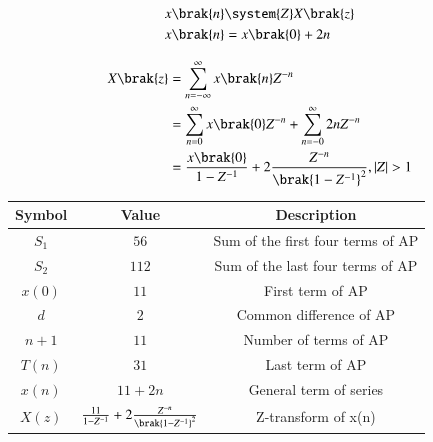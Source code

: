 \documentclass[journal,12pt,twocolumn]{IEEEtran}
\theoremstyle{remark}
\begin{document}
\begin{align}
	x \brak{n} &\system{Z} X \brak{z}\\
	x\brak{n}&=x\brak{0}+2n
\end{align}

\begin{align}
X\brak{z}&= \sum_{n=-\infty}^{\infty} x\brak{n}Z^{-n} \\
&=\sum_{n=0}^{\infty} x\brak{0}Z^{-n} + \sum_{n=-0}^{\infty}2nZ^{-n}\\
&=\frac{x\brak{0}}{1-Z^{-1}}+2\frac{Z^{-n}}{\brak{1-Z^{-1}}^{2}}, |Z|>1
\end{align}

\footnotesize
\centering
\begin{tabular}{|c|c|c|}
\hline
Symbol & Value & Description\\
\hline
$S_1$ & $56$ & Sum of the first four terms of AP\\
\hline
$S_2$ & $112$& Sum of the last four terms of AP\\
\hline
$x(0)$ & $11$ & First term of AP \\
\hline
$d$ &$ 2$ & Common difference of AP\\
\hline
$n+1$ & $11$ & Number of terms of AP\\
\hline
$T(n)$ & $31$ & Last term of AP\\
\hline
$x(n)$ &$ 11+2n $& General term of series\\
\hline
$X(z)$ & $\frac{11}{1-Z^{-1}}+2\frac{Z^{-n}}{\brak{1-Z^{-1}}^{2}}$ & Z-transform of x(n)\\
\hline
\end{tabular}
\\
\end{document}
